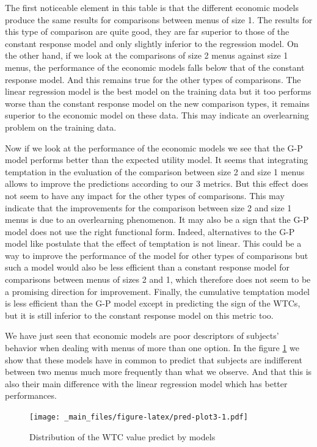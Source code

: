 \documentclass[
]{book}
\begin{document}
The first noticeable element in this table is that the different economic models
produce the same results for comparisons between menus of size 1.
The results for this type of comparison are quite good, they are far superior to
those of the constant response model and only slightly inferior to the
regression model.
On the other hand, if we look at the comparisons of size 2 menus against size 1
menus, the performance of the economic models falls below that of the constant
response model.
And this remains true for the other types of comparisons.
The linear regression model is the best model on the training data but it too
performs worse than the constant response model on the new comparison types, it
remains superior to the economic model on these data. This may indicate an
overlearning problem on the training data.

Now if we look at the performance of the economic models we see that the G-P
model performs better than the expected utility model.
It seems that integrating temptation in the evaluation of the comparison between
size 2 and size 1 menus allows to improve the predictions according to our 3
metrics.
But this effect does not seem to have any impact for the other types of
comparisons.
This may indicate that the improvements for the comparison between size 2 and
size 1 menus is due to an overlearning phenomenon.
It may also be a sign that the G-P model does not use the right functional form.
Indeed, alternatives to the G-P model like \citet{noor2015menu} postulate that the
effect of temptation is not linear.
This could be a way to improve the performance of the model for other types of
comparisons but such a model would also be less efficient than a constant
response model for comparisons between menus of sizes 2 and 1, which therefore
does not seem to be a promising direction for improvement.
Finally, the cumulative temptation model is less efficient than the G-P model
except in predicting the sign of the WTCs, but it is still inferior to the
constant response model on this metric too.

We have just seen that economic models are poor descriptors of subjects'
behavior when dealing with menus of more than one option.
In the figure \ref{fig:pred-plot3} we show that these models have in common to
predict that subjects are indifferent between two menus much more frequently
than what we observe.
And that this is also their main difference with the linear regression model
which has better performances.

\begin{figure}
\centering
\texttt{[image: \_main\_files/figure-latex/pred-plot3-1.pdf]}
\caption{\label{fig:pred-plot3}Distribution of the WTC value predict by models}
\end{figure}
\end{document}
